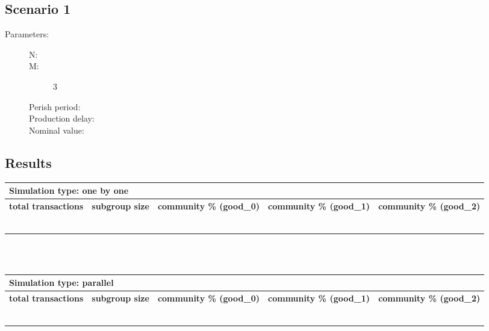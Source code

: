 \documentclass{article}
\begin{document}
\subsection{Scenario 1}
\begin{description}
  \item[Parameters:] \hfill
	\begin{description}
  		\item[N:] 
		\item[M:] 3
		\item[Perish period:] 
		\item[Production delay:]
		\item[Nominal value:]
	\end{description}
\end{description}

\subsection{Results}
\begin{tabular}{|  l | c | p{2.5cm} | p{2.5cm} | p{2.5cm} | }
     \multicolumn{5}{l}{\textbf{Simulation type: one by one}} \\ \hline
     \textbf{total transactions} & \textbf{subgroup size} & \textbf{community \% (good\_0)} & \textbf{community \% (good\_1)}  & \textbf{community \% (good\_2)} \\ \hline
     &  & & &  \\ \hline
     &  & & & \\ \hline
     &  & & & \\ \hline
     &  & & &  \\ \hline
     &  & & &  \\ \hline
     &  & & & \\ \hline
\end{tabular}
\\
\\
\begin{tabular}{|  l | c | p{2.5cm} | p{2.5cm} | p{2.5cm} | }
     \multicolumn{5}{l}{\textbf{Simulation type: parallel}} \\ \hline
     \textbf{total transactions} & \textbf{subgroup size} & \textbf{community \% (good\_0)} & \textbf{community \% (good\_1)}  & \textbf{community \% (good\_2)} \\ \hline
     &  & & &  \\ \hline
     &  & & & \\ \hline
     &  & & & \\ \hline
     &  & & &  \\ \hline
     &  & & &  \\ \hline
     &  & & & \\ \hline
\end{tabular}
\end{document}
